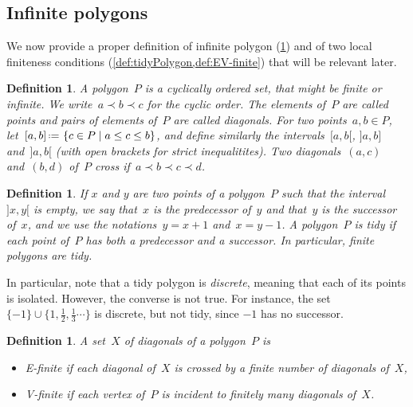 \documentclass{amsart}
\newtheorem{definition}[theorem]{Definition}
\theoremstyle{remark}
\newcommand{\darkblue}{\color{darkblue}} %
\newcommand{\defn}[1]{\textsl{\darkblue #1}} %
\newcommand{\set}[2]{\left\{ #1 \;\middle|\; #2 \right\}} %
\newcommand{\eqdef}{\mbox{\,\raisebox{0.2ex}{\scriptsize\ensuremath{\mathrm:}}\ensuremath{=}\,}} %
\newcommand*{\ef}[0]{E-finite\xspace}
\newcommand*{\vf}[0]{V-finite\xspace}
\newcommand{\cl}{\prec}
\begin{document}

\subsection{Infinite polygons}

We now provide a proper definition of infinite polygon (\cref{def:infinitePolygon}) and of two local finiteness conditions (\cref{def:tidyPolygon,def:EV-finite}) that will be relevant later.

\begin{definition}
\label{def:infinitePolygon}
A \defn{polygon}~$P$ is a cyclically ordered set, that might be finite or infinite.
We write~$a \cl b \cl c$ for the cyclic order.
The elements of~$P$ are called \defn{points} and pairs of elements of~$P$ are called \defn{diagonals}.
For two points~$a,b \in P$, let~$[a,b] \eqdef \set{c \in P}{a \le c \le b}$, and define similarly the intervals~$[a,b[$, $]a,b]$ and~$]a,b[$ (with open brackets for strict inequalitites).
Two diagonals~$(a,c)$ and~$(b,d)$ of~$P$ \defn{cross} if~$a \cl b \cl c \cl d$.
\end{definition}

\begin{definition}
\label{def:tidyPolygon}
If $x$ and $y$ are two points of a polygon~$P$ such that the interval~$]x,y[$ is empty, we say that~$x$ is the \defn{predecessor} of~$y$ and that~$y$ is the \defn{successor} of~$x$, and we use the notations~$y = x+1$ and~$x = y-1$. A polygon~$P$ is \defn{tidy} if each point of~$P$ has both a predecessor and a successor. In particular, finite polygons are tidy.
\end{definition}

In particular, note that a tidy polygon is \defn{discrete}, meaning that each of its points is isolated. However, the converse is not true. For instance, the set $\{-1\}\cup \{1, \frac{1}{2},\frac{1}{3}\cdots\}$ is discrete, but not tidy, since $-1$ has no successor.

\begin{definition}
\label{def:EV-finite}
A set~$X$ of diagonals of a polygon~$P$ is 
\begin{itemize}
\item \defn{\ef} if each diagonal of~$X$ is crossed by a finite number of diagonals of~$X$,
\item \defn{\vf} if each vertex of~$P$ is incident to finitely many diagonals of~$X$.
\end{itemize}
\end{definition}
\end{document}
